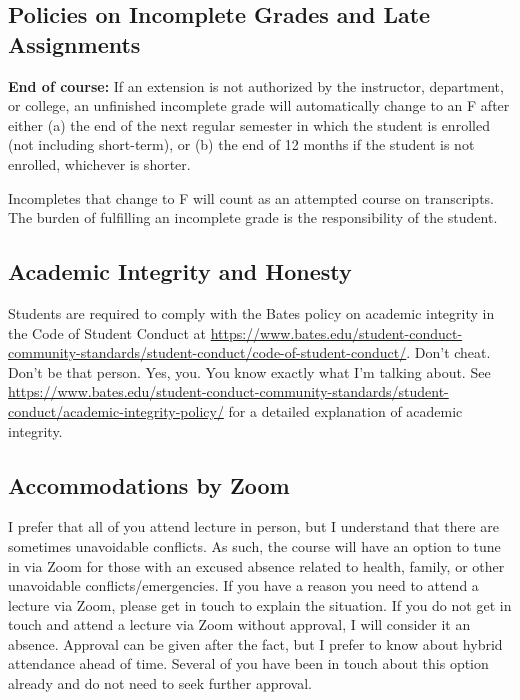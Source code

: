 \documentclass[11pt]{article}
\begin{document}
\subsection*{Policies on Incomplete Grades and Late Assignments}

\footnotesize{\textbf{End of course:} If an extension is not authorized by the instructor, department, or college, an unfinished incomplete grade will automatically change to an F after either (a) the end of the next regular semester in which the student is enrolled (not including short-term), or (b) the end of 12 months if the student is not enrolled, whichever is shorter.}

\footnotesize{Incompletes that change to F will count as an attempted course on transcripts. The burden of fulfilling an incomplete grade is the responsibility of the student.}

\subsection*{Academic Integrity and Honesty}
\footnotesize{Students are required to comply with the Bates policy on academic integrity in the Code of Student Conduct at \url{https://www.bates.edu/student-conduct-community-standards/student-conduct/code-of-student-conduct/}. Don't cheat. Don't be that person. Yes, you. You know exactly what I'm talking about. See \url{https://www.bates.edu/student-conduct-community-standards/student-conduct/academic-integrity-policy/} for a detailed explanation of academic integrity.}

\subsection*{Accommodations by Zoom}
\footnotesize{I prefer that all of you attend lecture in person, but I understand that there are sometimes unavoidable conflicts. As such, the course will have an option to tune in via Zoom for those with an excused absence related to health, family, or other unavoidable conflicts/emergencies. If you have a reason you need to attend a lecture via Zoom, please get in touch to explain the situation. If you do not get in touch and attend a lecture via Zoom without approval, I will consider it an absence. Approval can be given after the fact, but I prefer to know about hybrid attendance ahead of time. Several of you have been in touch about this option already and do not need to seek further approval.}
\end{document}
